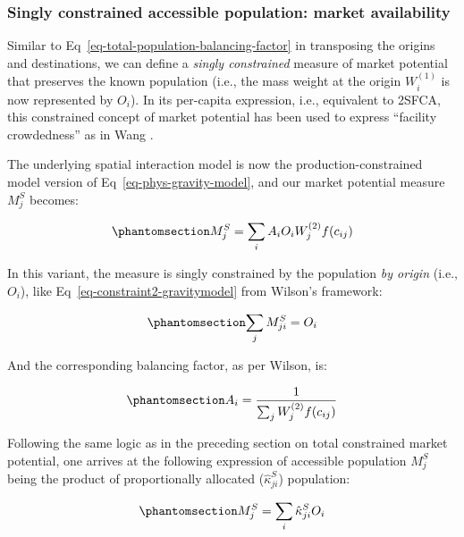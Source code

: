 \documentclass[
  10pt,
  letterpaper,
]{article}
\begin{document}
\subsubsection{Singly constrained accessible population: market
availability}\label{singly-constrained-accessible-population-market-availability}

Similar to Eq~\ref{eq-total-population-balancing-factor} in transposing
the origins and destinations, we can define a \emph{singly constrained}
measure of market potential that preserves the known population (i.e.,
the mass weight at the origin \(W_i^{(1)}\) is now represented by
\(O_i\)). In its per-capita expression, i.e., equivalent to 2SFCA, this
constrained concept of market potential has been used to express
``facility crowdedness'' as in Wang \citep{wang_inverted_2018}.

The underlying spatial interaction model is now the
production-constrained model version of Eq~\ref{eq-phys-gravity-model},
and our market potential measure \(M^S_j\) becomes:

\begin{equation}\phantomsection\label{eq-population-constrained-accessibility}{
M^S_j = \sum_i A_i O_i W_j^{(2)} f(c_{ij})
}\end{equation}

In this variant, the measure is singly constrained by the population
\emph{by origin} (i.e., \(O_i\)), like
Eq~\ref{eq-constraint2-gravitymodel} from Wilson's framework:

\begin{equation}\phantomsection\label{eq-population-constraint}{
\sum_j M^S_{ji} =  O_i 
}\end{equation}

And the corresponding balancing factor, as per Wilson, is:

\begin{equation}\phantomsection\label{eq-population-constrained-proportionality-constants}{
A_i = \frac{1}{\sum_j W_j^{(2)} f(c_{ij})}
}\end{equation}

Following the same logic as in the preceding section on total
constrained market potential, one arrives at the following expression of
accessible population \(M_j^S\) being the product of proportionally
allocated (\(\hat \kappa^S_{ji}\)) population:

\begin{equation}\phantomsection\label{eq-production-constrained-accessibility-with-proportional-allocation-factor}{
M^S_{j} = \sum_i \hat \kappa^S_{ji} O_i
}\end{equation}
\end{document}
